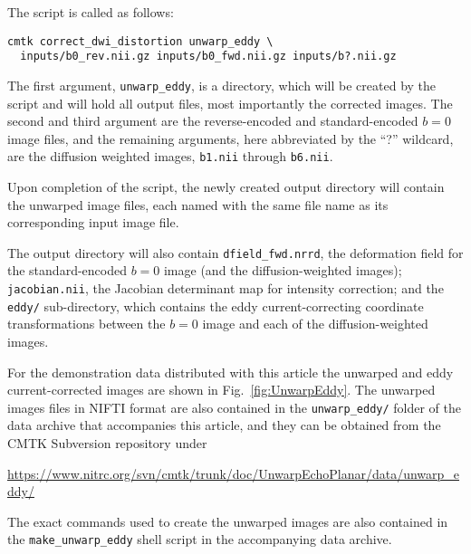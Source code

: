 \documentclass{InsightArticle}
\begin{document}
The script is called as follows:
\begin{verbatim}
cmtk correct_dwi_distortion unwarp_eddy \
  inputs/b0_rev.nii.gz inputs/b0_fwd.nii.gz inputs/b?.nii.gz
\end{verbatim}
The first argument, \verb|unwarp_eddy|, is a directory, which will be created
by the script and will hold all output files, most importantly the corrected
images. The second and third argument are the reverse-encoded and
standard-encoded $b=0$ image files, and the remaining arguments, here
abbreviated by the ``?'' wildcard, are the diffusion weighted images,
\verb|b1.nii| through \verb|b6.nii|.

Upon completion of the script, the newly created output directory will contain
the unwarped image files, each named with the same file name as its
corresponding input image file.

The output directory will also contain \verb|dfield_fwd.nrrd|, the deformation
field for the standard-encoded $b=0$ image (and the diffusion-weighted
images); \verb|jacobian.nii|, the Jacobian determinant map for intensity
correction; and the \verb|eddy/| sub-directory, which contains the eddy
current-correcting coordinate transformations between the $b=0$ image and each
of the diffusion-weighted images.

For the demonstration data distributed with this article the unwarped and eddy
current-corrected images are shown in Fig.~\ref{fig:UnwarpEddy}. The unwarped
images files in NIFTI format are also contained in the \verb|unwarp_eddy/| folder
of the data archive that accompanies this article, and they can be obtained
from the CMTK Subversion repository under

\centerline{\url{https://www.nitrc.org/svn/cmtk/trunk/doc/UnwarpEchoPlanar/data/unwarp_eddy/}}

The exact commands used to create the unwarped images are also contained in
the \verb|make_unwarp_eddy| shell script in the accompanying data archive.
\end{document}
